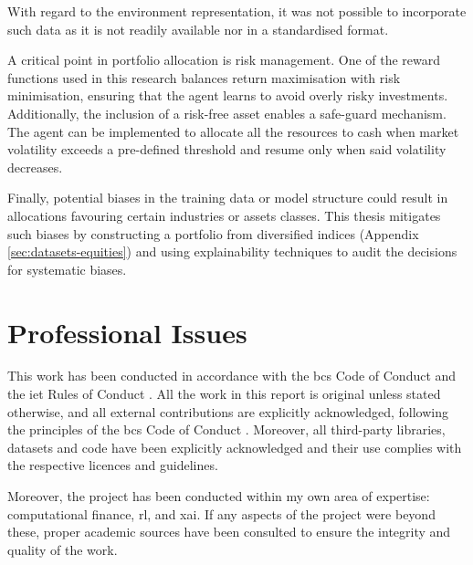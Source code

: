With regard to the environment representation, it was not possible to incorporate such data as it is not readily available nor in a standardised format. 

A critical point in portfolio allocation is risk management. One of the reward functions used in this research balances return maximisation with risk minimisation, ensuring that the agent learns to avoid overly risky investments.
Additionally, the inclusion of a risk-free asset enables a safe-guard mechanism. The agent can be implemented to allocate all the resources to cash when market volatility exceeds a pre-defined threshold and resume only when said volatility decreases.

Finally, potential biases in the training data or model structure could result in allocations favouring certain industries or assets classes. This thesis mitigates such biases by constructing a portfolio from diversified indices (Appendix \ref{sec:datasets-equities}) and using explainability techniques to audit the decisions for systematic biases.

\section{Professional Issues} \label{sec:professional-issues}

This work has been conducted in accordance with the \acrfull{bcs} Code of Conduct \cite{BCSCodeConduct} and the \acrfull{iet} Rules of Conduct \cite{IETRules}. All the work in this report is original unless stated otherwise, and all external contributions are explicitly acknowledged, following the principles of the \acrfull{bcs} Code of Conduct \cite{BCSCodeConduct}. Moreover, all third-party libraries, datasets and code have been explicitly acknowledged and their use complies with the respective licences and guidelines. 

Moreover, the project has been conducted within my own area of expertise: computational finance, \acrlong{rl}, and \acrlong{xai}. If any aspects of the project were beyond these, proper academic sources have been consulted to ensure the integrity and quality of the work. 
